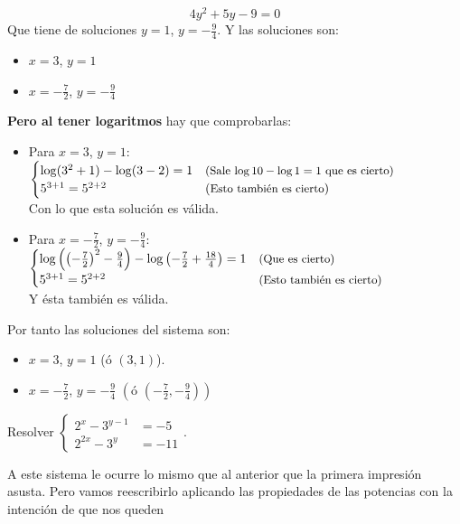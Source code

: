 \documentclass[a4paper,11pt,answers]{exam}
\begin{document}
\begin{questions}
\begin{solution}
      \[4y^2 + 5y - 9 = 0\]
      Que tiene de soluciones $y = 1$, $y =-\frac{9}{4}$. Y las soluciones son:
      \begin{itemize}
      \item $x = 3$, $y=1$
      \item $x= -\frac{7}{2}$, $y=-\frac{9}{4}$
      \end{itemize}
      \textbf{Pero al tener logaritmos} hay que comprobarlas:
      \begin{itemize}
      \item Para $x = 3$, $y=1$:
        $
        \begin{cases}
          \log (3^2+ 1) - \log(3-2) = 1 & \text{\small{(Sale $ \log 10 - \log 1 = 1
                                          $ que es cierto)}}\\
          5^{3+1} = 5^{2+2} & (\text{\small{Esto también es cierto}})
        \end{cases}$ \\
        Con lo que esta solución es válida.
      \item Para $x= -\frac{7}{2}$, $y=-\frac{9}{4}$:
        $
        \begin{cases}
          \log \left(\left(-\frac{7}{2}\right)^2-\frac{9}{4}\right) - \log \left( -\frac{7}{2} + \frac{18}{4} \right) = 1 & \text{\small{(Que es cierto)}}\\
          5^{3+1} = 5^{2+2} & \text{\small{(Esto también es cierto)}}
        \end{cases}$\\
        Y ésta también es válida.
      \end{itemize}
      Por tanto las soluciones del sistema son:
      \begin{itemize}
      \item $x = 3$, $y=1$ (ó $(3, 1)$).
      \item $x= -\frac{7}{2}$, $y=-\frac{9}{4}$ $\left(\text{ó }\left(-\frac{7}{2}, -\frac{9}{4}\right)\right)$
      \end{itemize}
    \end{solution}
  \question Resolver $
    \begin{cases}
      2^x - 3^{y-1} &=-5\\
      2^{2x} - 3^y &=-11
    \end{cases}$.
    \begin{solution}
      A este sistema le ocurre lo mismo que al anterior que la primera impresión asusta. Pero vamos
      reescribirlo aplicando las propiedades de las potencias con la intención de que nos queden

\end{solution}
\end{questions}
\end{document}
